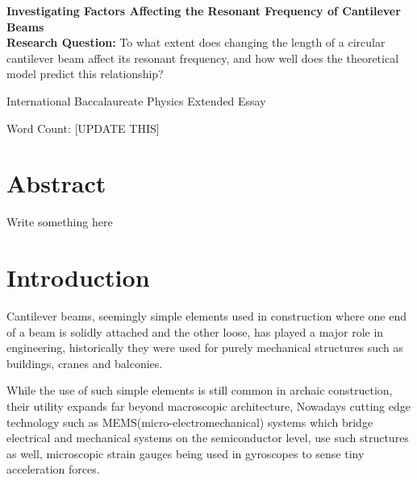 \documentclass[a4paper,12pt]{article}
\begin{document}
\begin{titlepage}
    \begin{center}
        \vspace*{1cm}

        \textbf{Investigating Factors Affecting the Resonant Frequency of Cantilever Beams}\\

        \vspace{.5cm}
        \textbf{Research Question:}
        To what extent does changing the length of a circular cantilever beam affect its resonant frequency, and how well does the theoretical model predict this relationship?

        \vspace{0.5cm}
        International Baccalaureate Physics Extended Essay

        \vfill

        \vspace{0.8cm}

        Word Count: [UPDATE THIS]\\


    \end{center}
\end{titlepage}

\tableofcontents
\pagebreak

\section{Abstract}%
Write something here

\section{Introduction}%

    Cantilever beams, seemingly simple elements used in construction where one end of a beam is solidly attached and the other loose, has played a major role in engineering, historically they were used for purely mechanical structures such as buildings, cranes and balconies.
    \autocite{BuildingConstructionBook}

    While the use of such simple elements is still common in archaic construction, their utility expands far beyond macroscopic architecture, Nowadays cutting edge technology such as MEMS(micro-electromechanical) systems which bridge electrical and mechanical systems on the semiconductor level, use such structures as well, microscopic strain gauges being used in gyroscopes to sense tiny acceleration forces.
    \autocite{MemsBook}%
\end{document}
